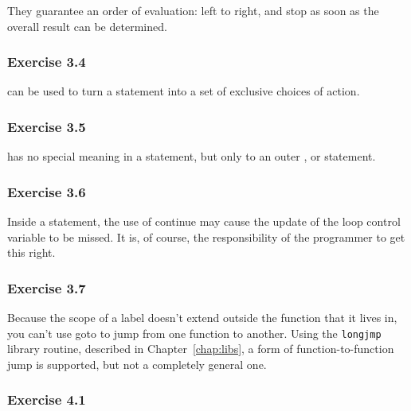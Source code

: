    They guarantee an order of evaluation: left to right, and stop as soon as
    the overall result can be determined.


  

  \subsubsection*{Exercise 3.4}

   \kbreak{} can be used to turn a \switch{} statement
    into a set of exclusive choices of action.


  

  \subsubsection*{Exercise 3.5}

  \continue{} has no special meaning in a \switch{} statement,
  but only to an outer \kdo, \while{} or \for{} statement.


  

  \subsubsection*{Exercise 3.6}

   Inside a \while{} statement, the use of continue may cause the
    update of the loop control variable to be missed. It is, of course, the
    responsibility of the programmer to get this right.


  

  \subsubsection*{Exercise 3.7}

  Because the scope of a label doesn't extend outside the function that it
  lives in, you can't use goto to jump from one function to another. Using
  the \texttt{longjmp} library routine, described in Chapter~\ref{chap:libs},
  a form of function-to-function jump is supported, but not
  a completely general one.


  

 

  

  \subsubsection*{Exercise 4.1}

